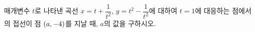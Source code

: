 매개변수 $t$로 나타낸 곡선 $x=t+\dfrac{1}{t^2}$, $y=t^2-\dfrac{1}{t^2}$에 대하여 $t=1$에 대응하는 점에서의 접선이 점 $(a{,}\mkern3mu\mathopen{}-4)$를 지날 때, $a$의 값을 구하시오.
